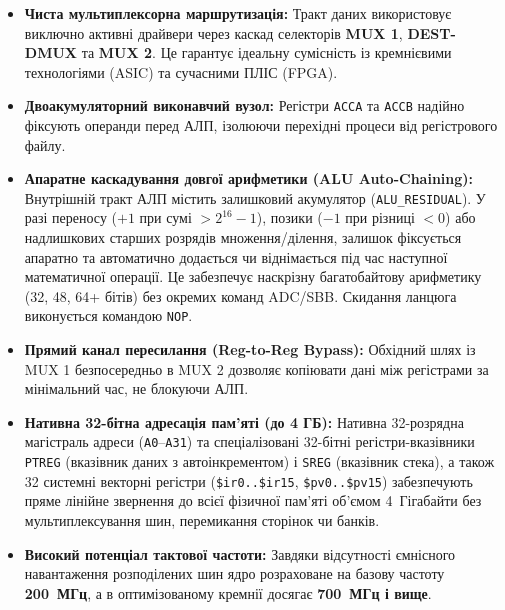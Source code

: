 \documentclass[11pt,a4paper]{article}
\newcommand{\reg}[1]{\texttt{#1}}
\begin{document}
\begin{itemize}
  \item \textbf{Чиста мультиплексорна маршрутизація:} Тракт даних використовує виключно активні драйвери через каскад селекторів \textbf{MUX 1}, \textbf{DEST-DMUX} та \textbf{MUX 2}. Це гарантує ідеальну сумісність із кремнієвими технологіями (ASIC) та сучасними ПЛІС (FPGA).
  \item \textbf{Двоакумуляторний виконавчий вузол:} Регістри \reg{ACCA} та \reg{ACCB} надійно фіксують операнди перед АЛП, ізолюючи перехідні процеси від регістрового файлу.
  \item \textbf{Апаратне каскадування довгої арифметики (ALU Auto-Chaining):} Внутрішній тракт АЛП містить залишковий акумулятор (\reg{ALU\_RESIDUAL}). У разі переносу ($+1$ при сумі $>2^{16}-1$), позики ($-1$ при різниці $<0$) або надлишкових старших розрядів множення/ділення, залишок фіксується апаратно та автоматично додається чи віднімається під час наступної математичної операції. Це забезпечує наскрізну багатобайтову арифметику (32, 48, 64+ бітів) без окремих команд ADC/SBB. Скидання ланцюга виконується командою \texttt{NOP}.
  \item \textbf{Прямий канал пересилання (Reg-to-Reg Bypass):} Обхідний шлях із MUX 1 безпосередньо в MUX 2 дозволяє копіювати дані між регістрами за мінімальний час, не блокуючи АЛП.
  \item \textbf{Нативна 32-бітна адресація пам'яті (до 4 ГБ):} Нативна 32-розрядна магістраль адреси (\texttt{A0}--\texttt{A31}) та спеціалізовані 32-бітні регістри-вказівники \reg{PTREG} (вказівник даних з автоінкрементом) і \reg{SREG} (вказівник стека), а також 32 системні векторні регістри (\texttt{\$ir0..\$ir15}, \texttt{\$pv0..\$pv15}) забезпечують пряме лінійне звернення до всієї фізичної пам'яті об'ємом 4~Гігабайти без мультиплексування шин, перемикання сторінок чи банків.
  \item \textbf{Високий потенціал тактової частоти:} Завдяки відсутності ємнісного навантаження розподілених шин ядро розраховане на базову частоту \textbf{200~МГц}, а в оптимізованому кремнії досягає \textbf{700~МГц і вище}.
\end{itemize}
\end{document}

